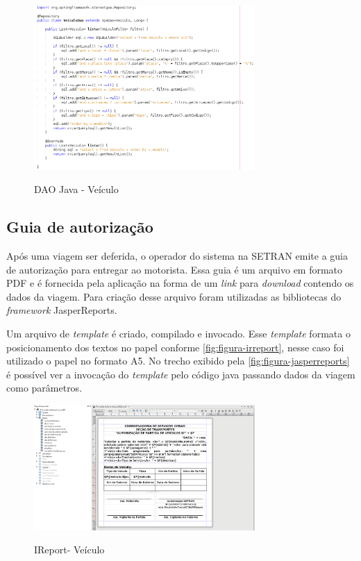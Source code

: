 \begin{figure}[!htb]
    \centering
    \caption{DAO Java - Veículo}
    \includegraphics[width=0.75\textwidth]{dados/figuras/dao.png}
    \label{fig:figura-dao}
\end{figure}


\subsection{Guia de autorização}
\label{sbs:desenvolvimentoJasper}

Após uma viagem ser deferida, o operador do sistema na SETRAN emite a guia de autorização para entregar ao motorista. Essa guia é um arquivo em formato PDF e é fornecida pela aplicação na forma de um \textit{link} para \textit{download} contendo os dados da viagem. Para criação desse arquivo foram utilizadas as bibliotecas do \textit{framework} JasperReports. 

Um arquivo de \textit{template} é criado, compilado e invocado. Esse \textit{template} formata o posicionamento dos textos no papel conforme \autoref{fig:figura-irreport}, nesse caso foi utilizado o papel no formato A5.
No trecho exibido pela \autoref{fig:figura-jasperreports} é possível ver a invocação do \textit{template} pelo código java passando dados da viagem como parâmetros.

\begin{figure}[!htb]
    \centering
    \caption{IReport- Veículo}
    \includegraphics[width=0.75\textwidth]{dados/figuras/veiculos-ireport.png}
    \label{fig:figura-irreport}
\end{figure}


